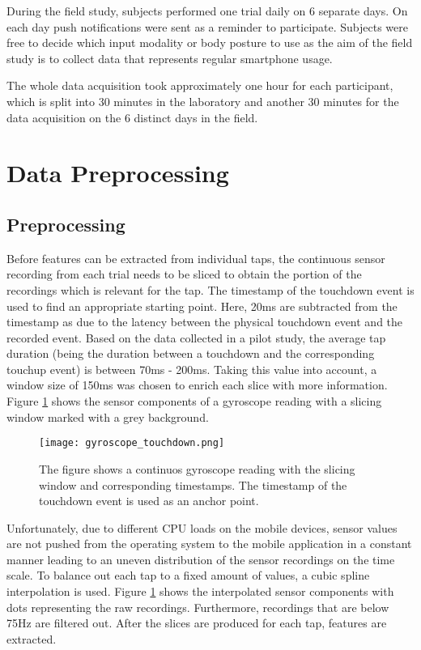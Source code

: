 During the field study, subjects performed one trial daily on 6 separate days. On each day push notifications were sent as a reminder to participate. Subjects were free to decide which input modality or body posture to use as the aim of the field study is to collect data that represents regular smartphone usage.

The whole data acquisition took approximately one hour for each participant, which is split into 30 minutes in the laboratory and another 30 minutes for the data acquisition on the 6 distinct days in the field.

\section{Data Preprocessing \label{cha:chapter4}}
\subsection{Preprocessing}
Before features can be extracted from individual taps, the continuous sensor recording from each trial needs to be sliced to obtain the portion of the recordings which is relevant for the tap. The timestamp of the touchdown event is used to find an appropriate starting point. Here, 20ms are subtracted from the timestamp as due to the latency between the physical touchdown event and the recorded event. Based on the data collected in a pilot study, the average tap duration (being the duration between a touchdown and the corresponding touchup event) is between 70ms - 200ms. Taking this value into account, a window size of 150ms was chosen to enrich each slice with more information. Figure \ref{fig:touchdown} shows the sensor components of a gyroscope reading with a slicing window marked with a grey background. 

\begin{figure}[h!]
  \centering
  \texttt{[image: gyroscope\_touchdown.png]}
  \caption{The figure shows a continuos gyroscope reading with the slicing window and corresponding timestamps. The timestamp of the touchdown event is used as an anchor point.} \label{fig:touchdown}
\end{figure}

Unfortunately, due to different CPU loads on the mobile devices, sensor values are not pushed from the operating system to the mobile application in a constant manner leading to an uneven distribution of the sensor recordings on the time scale. To balance out each tap to a fixed amount of values, a cubic spline interpolation is used. Figure \ref{fig:touchdown} shows the interpolated sensor components with dots representing the raw recordings. Furthermore, recordings that are below 75Hz are filtered out. After the slices are produced for each tap, features are extracted.

